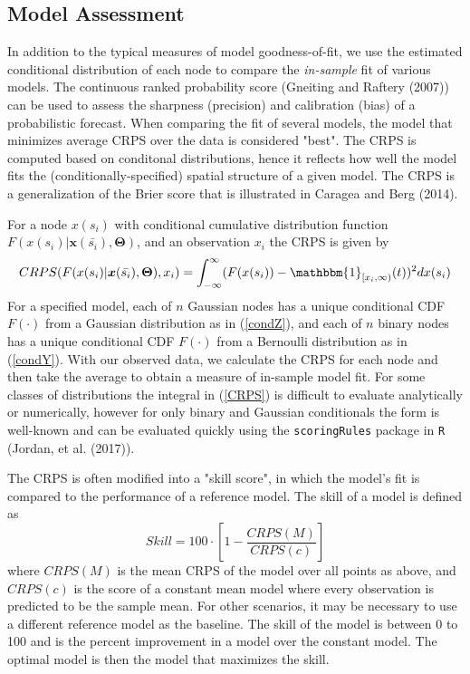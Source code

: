 \documentclass[12pt, a4paper, twoside]{article}
\begin{document}
\subsection{Model Assessment} \label{ModCRPS}
In addition to the typical measures of model goodness-of-fit, we use the estimated conditional distribution of each node to compare the \textit{in-sample} fit of various models. The continuous ranked probability score (Gneiting and Raftery (2007)) can be used to assess the sharpness (precision) and calibration (bias) of a probabilistic forecast.  When comparing the fit of several models, the model that minimizes average CRPS over the data is considered "best". The CRPS is computed based on conditonal distributions, hence it reflects how well the model fits the (conditionally-specified) spatial structure of a given model. The CRPS is a generalization of the Brier score that is illustrated in Caragea and Berg (2014).

For a node $x(s_i)$ with conditional cumulative distribution function $F(x(s_i)|\boldsymbol{x}(\bar{s_i}), \boldsymbol{\Theta})$, and an observation $x_i$ the CRPS is given by
\begin{equation} \label{CRPS}
CRPS(F(x(s_i)|\boldsymbol{x}(\bar{s_i}), \boldsymbol{\Theta}), x_i) = \int_{-\infty}^{\infty}(F(x(s_i)) - \mathbbm{1}_{\lbrack x_i,\infty)}(t))^2 dx(s_i)
\end{equation}
For a specified model, each of $n$ Gaussian nodes has a unique conditional CDF $F(\cdot)$ from a Gaussian distribution as in (\ref{condZ}), and each of $n$ binary nodes has a unique conditional CDF $F(\cdot)$ from a Bernoulli distribution as in (\ref{condY}). With our observed data, we calculate the CRPS for each node and then take the average to obtain a measure of in-sample model fit. For some classes of distributions the integral in (\ref{CRPS}) is difficult to evaluate analytically or numerically, however for only binary and Gaussian conditionals the form is well-known and can be evaluated quickly using the \texttt{scoringRules} package in \texttt{R} (Jordan, et al. (2017)).

The CRPS is often modified into a "skill score", in which the model's fit is compared to the performance of a reference model. The skill of a model is defined as
\begin{equation}
Skill = 100 \cdot \left\lbrack 1 - \frac{CRPS(M)}{CRPS(c)}\right\rbrack
\end{equation}
where $CRPS(M)$ is the mean CRPS of the model over all points as above, and $CRPS(c)$ is the score of a constant mean model where every observation is predicted to be the sample mean. For other scenarios, it may be necessary to use a different reference model as the baseline. The skill of the model is between 0 to 100 and is the percent improvement in a model over the constant model. The optimal model is then the model that maximizes the skill.
\end{document}
